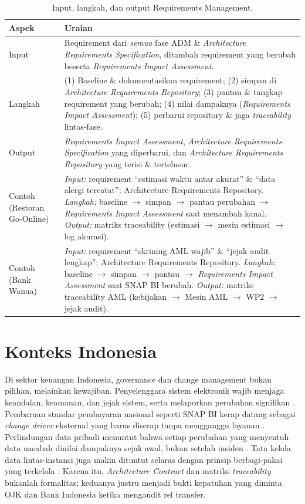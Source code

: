\begin{table}[htbp]
\centering
\scriptsize
\caption{Input, langkah, dan output Requirements Management.}
\label{tab:io-rm}
\begin{tabularx}{\textwidth}{@{}p{} X@{}}
\hline
\textbf{Aspek} & \textbf{Uraian} \\
\hline
Input & Requirement dari \emph{semua} fase ADM \& \emph{Architecture Requirements
Specification}, ditambah requirement yang berubah beserta \emph{Requirements Impact
Assessment}. \\
Langkah & (1) Baseline \& dokumentasikan requirement; (2) simpan di
\emph{Architecture Requirements Repository}; (3) pantau \& tangkap requirement yang
berubah; (4) nilai dampaknya (\emph{Requirements Impact Assessment}); (5) perbarui
repository \& jaga \emph{traceability} lintas-fase. \\
Output & \emph{Requirements Impact Assessment}, \emph{Architecture Requirements
Specification} yang diperbarui, dan \emph{Architecture Requirements Repository} yang
terisi \& tertelusur. \\
Contoh (Restoran Go-Online) & \emph{Input:} requirement ``estimasi waktu antar
akurat'' \& ``data alergi tercatat''; Architecture Requirements Repository.
\emph{Langkah:} baseline $\rightarrow$ simpan $\rightarrow$ pantau perubahan
$\rightarrow$ \emph{Requirements Impact Assessment} saat menambah kanal.
\emph{Output:} matriks traceability (estimasi $\rightarrow$ mesin estimasi
$\rightarrow$ log akurasi). \\
Contoh (Bank Wanua) & \emph{Input:} requirement ``skrining AML wajib'' \& ``jejak
audit lengkap''; Architecture Requirements Repository. \emph{Langkah:} baseline
$\rightarrow$ simpan $\rightarrow$ pantau $\rightarrow$ \emph{Requirements Impact
Assessment} saat SNAP BI berubah. \emph{Output:} matriks traceability AML (kebijakan
$\rightarrow$ Mesin AML $\rightarrow$ WP2 $\rightarrow$ jejak audit). \\
\hline
\end{tabularx}
\end{table}

\section{Konteks Indonesia}

Di sektor keuangan Indonesia, governance dan change management bukan pilihan,
melainkan kewajiban. Penyelenggara sistem elektronik wajib menjaga keandalan,
keamanan, dan jejak sistem, serta melaporkan perubahan signifikan
\cite{pp712019}. Pembaruan standar pembayaran nasional seperti SNAP BI kerap
datang sebagai \emph{change driver} eksternal yang harus diserap tanpa mengganggu
layanan \cite{snapbi}. Perlindungan data pribadi menuntut bahwa setiap perubahan
yang menyentuh data nasabah dinilai dampaknya sejak awal, bukan setelah insiden
\cite{uupdp2022}. Tata kelola data lintas-instansi juga makin dituntut selaras
dengan prinsip berbagi-pakai yang terkelola \cite{satudata}. Karena itu,
\emph{Architecture Contract} dan matriks \emph{traceability} bukanlah formalitas;
keduanya justru menjadi bukti kepatuhan yang diminta OJK dan Bank Indonesia ketika
mengaudit rel transfer.

